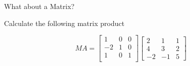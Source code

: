 \documentclass[10pt]{beamer}
\begin{document}
\begin{frame}[shrink]{What about a Matrix?}
    \begin{example}
        Calculate the following matrix  product
            
            $$  MA =     
            \begin{bmatrix}
          1 & 0 & 0\\
        -2 & 1 & 0\\
        1 & 0 & 1\\
        \end{bmatrix} \begin{bmatrix}2 &1&1\\ 4 &3&2\\ -2 &-1&5\end{bmatrix}$$ 
    \end{example}


\end{frame}
\end{document}
